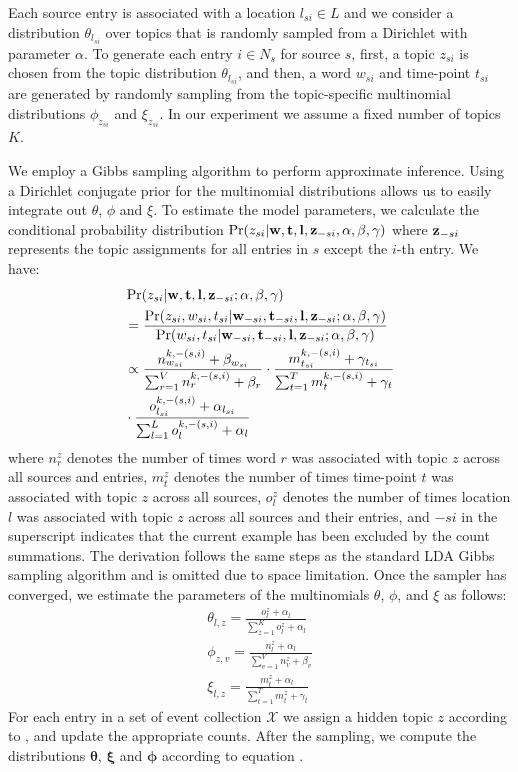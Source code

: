 \documentclass[conference]{IEEEtran}
\newcommand{\w}{{\bf w}}
\newcommand{\z}{{\bf z}}
\newcommand{\loc}{{\bf l}}
\newcommand{\tim}{{\bf t}}
\begin{document}
Each source entry is associated with a location $l_{si} \in L$ and we consider a distribution $\theta_{l_{si}}$ over topics that is randomly sampled from a Dirichlet with parameter $\alpha$. To generate each entry $i \in N_s$ for source $s$, first, a topic $z_{si}$ is chosen from the topic distribution $\theta_{l_{si}}$, and then, a word $w_{si}$ and time-point $t_{si}$ are generated by randomly sampling from the topic-specific multinomial distributions $\phi_{z_{si}}$ and $\xi_{z_{si}}$.  In our experiment we assume a fixed number of topics $K$.

We employ a Gibbs sampling algorithm to perform approximate inference. Using a Dirichlet conjugate prior for the multinomial distributions allows us to easily integrate out $\theta$, $\phi$ and $\xi$.  To estimate the model parameters, we calculate the conditional probability distribution $\Pr(z_{si}|{\bf w},{\bf t}, {\bf l}, {\bf z}_{-si}, \alpha, \beta, \gamma)$ where ${\bf z}_{-si}$ represents the topic assignments for all entries in $s$ except the $i$-th entry. We have:
\begin{align}
\label{eq:conditional}
&\Pr(z_{si}| \w,\tim,\loc,\z_{-si};\alpha,\beta,\gamma) \nonumber \\
&= \frac{\Pr(z_{si}, w_{si}, t_{si}|\w_{-si},\tim_{-si},\loc,\z_{-si};\alpha,\beta,\gamma)}{\Pr(w_{si}, t_{si}|\w_{-si},\tim_{-si},\loc,\z_{-si};\alpha,\beta,\gamma)} \nonumber \\
& \propto \frac{n^{k,-(s,i)}_{w_{si}} + \beta_{w_{si}}}{\sum_{r = 1}^V n^{k,-(s,i)}_{r} + \beta_{r}} \cdot \frac{m^{k,-(s,i)}_{t_{si}} + \gamma_{t_{si}}}{\sum_{t = 1}^T m^{k,-(s,i)}_{t} + \gamma_{t}} \nonumber \\
& \cdot \frac{o^{k,-(s,i)}_{l_{si}} + \alpha_{l_{si}}}{\sum_{l = 1}^L o^{k,-(s,i)}_{l} + \alpha_{l}}
\end{align}
where $n^{z}_{r}$ denotes the number of times word $r$ was associated with topic $z$ across all sources and entries, $m^{z}_{t}$ denotes the number of times time-point $t$ was associated with topic $z$ across all sources, $o^z_l$ denotes the number of times location $l$ was associated with topic $z$ across all sources and their entries, and $-si$ in the superscript indicates that the current example has been excluded by the count summations. The derivation follows the same steps as the standard LDA Gibbs sampling algorithm and is omitted due to space limitation. Once the sampler has converged, we estimate the parameters of the multinomials $\theta$, $\phi$, and $\xi$ as follows:
\begin{align}
\label{eq:updates}
\theta_{l,z} = \frac{o^z_l + \alpha_l}{\sum_{z=1}^K o^z_l + \alpha_l} \nonumber \\
\phi_{z,v} = \frac{n^z_l + \alpha_l}{\sum_{v=1}^V n^z_v + \beta_v}  \\
\xi_{l,z} = \frac{m^z_t + \alpha_l}{\sum_{t=1}^T m^z_t + \gamma_t} \nonumber
\end{align}
For each entry in a set of event collection $\mathcal{X}$ we assign a hidden topic $z$ according to , and update the appropriate counts. After the sampling, we compute the distributions ${\boldsymbol \theta}$, ${\boldsymbol \xi}$ and ${\boldsymbol \phi}$ according to equation .   
\end{document}
